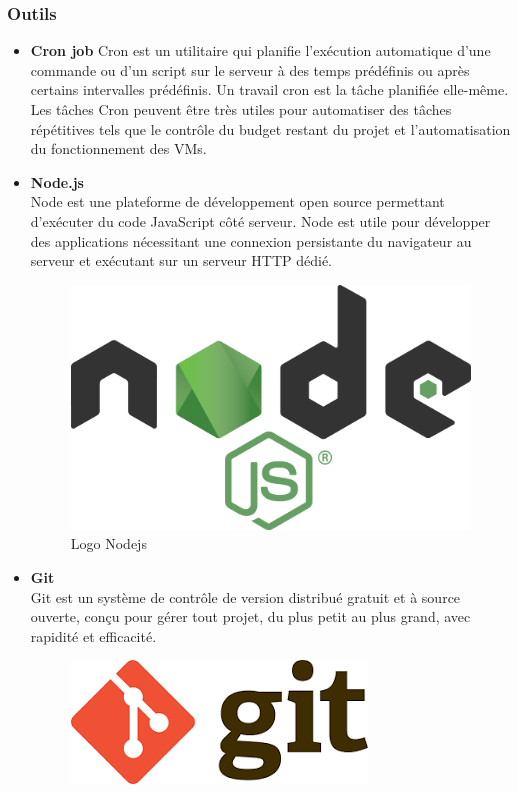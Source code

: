 \subsubsection{Outils}
\begin{itemize}
\item 	\textbf{Cron job} \newline
	Cron est un utilitaire qui planifie l'exécution automatique d'une commande ou d'un script sur le serveur  à des temps prédéfinis ou après certains intervalles prédéfinis. Un travail cron est la tâche planifiée elle-même. Les tâches Cron peuvent être très utiles pour automatiser des tâches répétitives tels que le contrôle  du budget restant du projet et l'automatisation du fonctionnement des VMs.
	\item \textbf{Node.js} \\Node est une plateforme de développement open source permettant d'exécuter du code JavaScript côté serveur. Node est utile pour développer des applications nécessitant une connexion persistante du navigateur au serveur et exécutant sur un serveur HTTP dédié.
	\begin{figure}[H]
		\centering
		\includegraphics[scale=0.05]{node.png}
		\caption{Logo Nodejs}
		\label{Logo Nodejs}
	\end{figure} 
\item 
\textbf{Git} \\ Git est un système de contrôle de version distribué gratuit et à source ouverte, conçu pour gérer tout projet, du plus petit au plus grand, avec rapidité et efficacité.
	\begin{figure}[H]
	\centering
	\includegraphics[scale=0.2]{git.png}

\end{figure}
\end{itemize}
